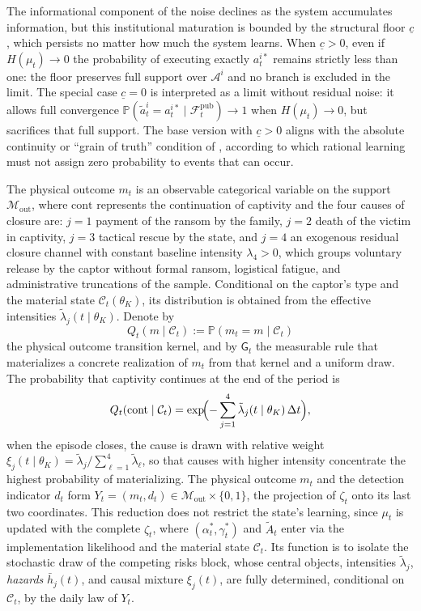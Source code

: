 \documentclass[review,authoryear,12pt]{elsarticle}
\theoremstyle{plain}
\theoremstyle{definition}
\newcommand{\Prob}{\mathbb{P}}
\newcommand{\1}{\mathbf{1}}
\begin{document}
The informational component of the noise declines as the system accumulates information, but this institutional maturation is bounded by the structural floor $\underline{c}$, which persists no matter how much the system learns. When $\underline{c}>0$, even if $H(\mu_t)\to 0$ the probability of executing exactly $a_t^{i\ast}$ remains strictly less than one: the floor preserves full support over $\mathcal{A}^i$ and no branch is excluded in the limit. The special case $\underline{c}=0$ is interpreted as a limit without residual noise: it allows full convergence $\Prob(\tilde{a}_t^i=a_t^{i\ast}\mid\mathcal{F}_t^{\mathrm{pub}})\to 1$ when $H(\mu_t)\to 0$, but sacrifices that full support. The base version with $\underline{c}>0$ aligns with the absolute continuity or ``grain of truth'' condition of \citet{KalaiLehrer1993}, according to which rational learning must not assign zero probability to events that can occur.

The physical outcome $m_t$ is an observable categorical variable on the support $\mathcal{M}_{\mathrm{out}}$, where $\mathrm{cont}$ represents the continuation of captivity and the four causes of closure are: $j=1$ payment of the ransom by the family, $j=2$ death of the victim in captivity, $j=3$ tactical rescue by the state, and $j=4$ an exogenous residual closure channel with constant baseline intensity $\lambda_4>0$, which groups voluntary release by the captor without formal ransom, logistical fatigue, and administrative truncations of the sample. Conditional on the captor's type and the material state $\mathcal{C}_t(\theta_K)$, its distribution is obtained from the effective intensities $\tilde{\lambda}_j(t\mid\theta_K)$. Denote by
\[
Q_t(m\mid\mathcal{C}_t):=\Prob(m_t=m\mid\mathcal{C}_t)
\]
the physical outcome transition kernel, and by $\mathsf{G}_t$ the measurable rule that materializes a concrete realization of $m_t$ from that kernel and a uniform draw. The probability that captivity continues at the end of the period is
\[
Q_t(\mathrm{cont}\mid\mathcal{C}_t)=\exp\!\Bigl(-\sum_{j=1}^{4}\tilde{\lambda}_j(t\mid\theta_K)\,\Delta t\Bigr),
\]
when the episode closes, the cause is drawn with relative weight $\xi_j(t\mid\theta_K)=\tilde{\lambda}_j/\sum_{\ell=1}^{4}\tilde{\lambda}_\ell$, so that causes with higher intensity concentrate the highest probability of materializing. The physical outcome $m_t$ and the detection indicator $d_t$ form $Y_t=(m_t,d_t)\in\mathcal{M}_{\mathrm{out}}\times\{0,1\}$, the projection of $\zeta_t$ onto its last two coordinates. This reduction does not restrict the state's learning, since $\mu_t$ is updated with the complete $\zeta_t$, where $(\alpha_t^\ast,\gamma_t^\ast)$ and $\tilde{A}_t$ enter via the implementation likelihood and the material state $\mathcal{C}_t$. Its function is to isolate the stochastic draw of the competing risks block, whose central objects, intensities $\tilde{\lambda}_j$, \textit{hazards} $\bar{h}_j(t)$, and causal mixture $\xi_j(t)$, are fully determined, conditional on $\mathcal{C}_t$, by the daily law of $Y_t$.
\end{document}
